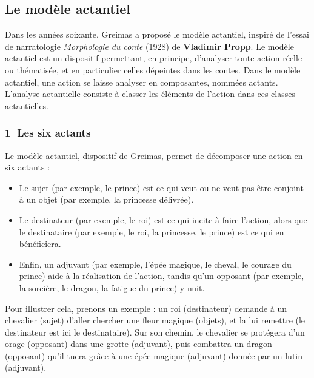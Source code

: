 \subsection{Le modèle actantiel}
Dans les années soixante, Greimas a proposé le modèle actantiel, inspiré de l’essai de narratologie \textit{Morphologie du conte} (1928) de \textbf{Vladimir Propp}. Le modèle actantiel est un dispositif permettant, en principe, d’analyser toute action réelle ou thématisée, et en particulier celles dépeintes dans les contes. Dans le modèle actantiel, une action se laisse analyser en composantes, nommées actants. L’analyse actantielle consiste à classer les éléments de l’action dans ces classes actantielles.

\subsubsection*{\textcircled{\scriptsize 1} Les six actants}
Le modèle actantiel, dispositif de Greimas, permet de décomposer une action en six actants :
\begin{itemize}
\item Le sujet (par exemple, le prince) est ce qui veut ou ne veut pas être conjoint à un objet (par exemple, la princesse délivrée).
\item Le destinateur (par exemple, le roi) est ce qui incite à faire l’action, alors que le destinataire (par exemple, le roi, la princesse, le prince) est ce qui en bénéficiera.
\item Enfin, un adjuvant (par exemple, l’épée magique, le cheval, le courage du prince) aide à la réalisation de l’action, tandis qu’un opposant (par exemple, la sorcière, le dragon, la fatigue du prince) y nuit.
\end{itemize}
Pour illustrer cela, prenons un exemple : un roi (destinateur) demande à un chevalier (sujet) d’aller chercher une fleur magique (objets), et la lui remettre (le destinateur est ici le destinataire). Sur son chemin, le chevalier se protégera d’un orage (opposant) dans une grotte (adjuvant), puis combattra un dragon (opposant) qu’il tuera grâce à une épée magique (adjuvant) donnée par un lutin (adjuvant).

